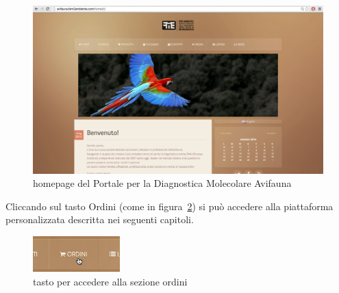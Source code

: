 \begin{figure}
\includegraphics[width=1\textwidth]{images/homepage-wp} 
\caption{homepage del Portale per la Diagnostica Molecolare Avifauna}
\label{fig:homepage}
\end{figure}

Cliccando sul tasto \textsf{Ordini} (come in figura~\ref{fig:homepage-ordini}) si può accedere alla piattaforma personalizzata descritta nei seguenti capitoli.

\begin{figure}
 \centering
 \includegraphics[width=0.3\textwidth]{images/homepage-wp-ordini} 
 \caption{tasto per accedere alla sezione ordini}
 \label{fig:homepage-ordini}
\end{figure}